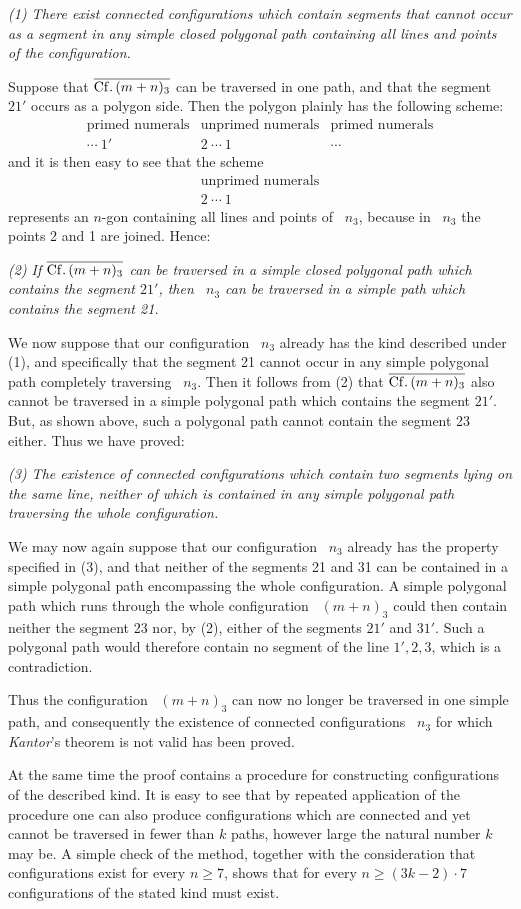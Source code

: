\documentclass[11pt,a4paper]{article}
\begin{document}
\emph{(1) There exist connected configurations which contain segments that cannot occur as a segment in any simple closed polygonal path containing all lines and points of the configuration.}

Suppose that $\overline{\mathrm{Cf.}\,(m+n)_3}$ can be traversed in one path, and that the segment $21'$ occurs as a polygon side. Then the polygon plainly has the following scheme:
\[
\begin{array}{ccc}
\text{primed numerals} & \text{unprimed numerals} & \text{primed numerals}\\
\cdots\ 1' & 2\ \cdots\ 1 & \cdots
\end{array}
\]
and it is then easy to see that the scheme
\[
\begin{array}{c}
\text{unprimed numerals}\\
2\ \cdots\ 1
\end{array}
\]
represents an $n$-gon containing all lines and points of \Cf\ $n_3$, because in \Cf\ $n_3$ the points 2 and 1 are joined. Hence:

\emph{(2) If $\overline{\mathrm{Cf.}\,(m+n)_3}$ can be traversed in a simple closed polygonal path which contains the segment $21'$, then \Cf\ $n_3$ can be traversed in a simple path which contains the segment 21.}

We now suppose that our configuration \Cf\ $n_3$ already has the kind described under (1), and specifically that the segment 21 cannot occur in any simple polygonal path completely traversing \Cf\ $n_3$. Then it follows from (2) that $\overline{\mathrm{Cf.}\,(m+n)_3}$ also cannot be traversed in a simple polygonal path which contains the segment $21'$. But, as shown above, such a polygonal path cannot contain the segment 23 either. Thus we have proved:

\emph{(3) The existence of connected configurations which contain two segments lying on the same line, neither of which is contained in any simple polygonal path traversing the whole configuration.}

We may now again suppose that our configuration \Cf\ $n_3$ already has the property specified in (3), and that neither of the segments 21 and 31 can be contained in a simple polygonal path encompassing the whole configuration. A simple polygonal path which runs through the whole configuration \Cf\ $(m+n)_3$ could then contain neither the segment 23 nor, by (2), either of the segments $21'$ and $31'$. Such a polygonal path would therefore contain no segment of the line $1',2,3$, which is a contradiction.

Thus the configuration \Cf\ $(m+n)_3$ can now no longer be traversed in one simple path, and consequently the existence of connected configurations \Cf\ $n_3$ for which \emph{Kantor}'s theorem is not valid has been proved.

At the same time the proof contains a procedure for constructing configurations of the described kind. It is easy to see that by repeated application of the procedure one can also produce configurations which are connected and yet cannot be traversed in fewer than $k$ paths, however large the natural number $k$ may be. A simple check of the method, together with the consideration that configurations exist for every $n\geq7$, shows that for every $n\geq(3k-2)\cdot7$ configurations of the stated kind must exist.
\end{document}

